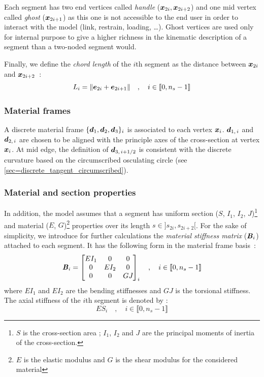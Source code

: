 Each segment has two end vertices called \emph{handle} ($\boldsymbol{x}_{2i}, \boldsymbol{x}_{2i+2}$) and one mid vertex called \emph{ghost} ($\boldsymbol{x}_{2i+1}$) as this one is not accessible to the end user in order to interact with the model (link, restrain, loading, \dots). Ghost vertices are used only for internal purpose to give a higher richness in the kinematic description of a segment than a two-noded segment would.

Finally, we define the \emph{chord length} of the $i$th segment as the distance between $\boldsymbol{x}_{2i}$ and $\boldsymbol{x}_{2i+2}$~:
\begin{equation}
	L_i = \lVert\boldsymbol{e}_{2i} + \boldsymbol{e}_{2i+1}\rVert \quad , \quad i \in \llbracket 0, n_s-1 \rrbracket
\end{equation}

\subsubsection{Material frames}
A discrete material frame $\{\boldsymbol{d}_{1}, \boldsymbol{d}_{2}, \boldsymbol{d}_{3}\}_i$ is associated to each vertex $\boldsymbol{x}_i$. $\boldsymbol{d}_{1,\,i}$ and $\boldsymbol{d}_{2,\,i}$ are chosen to be aligned with the principle axes of the cross-section at vertex $\boldsymbol{x}_i$. At mid edge, the definition of $\boldsymbol{d}_{3,\,i+1/2}$ is consistent with the discrete curvature based on the circumscribed osculating circle (see \cref{sec=discrete_tangent_circumscribed}).

\subsubsection{Material and section properties}
In addition, the model assumes that a segment has uniform section ($S$, $I_1$, $I_2$, $J$)\footnote{$S$ is the cross-section area ; $I_1$, $I_2$ and $J$ are the principal moments of inertia of the cross-section.} and material ($E$, $G$)\footnote{$E$ is the elastic modulus and $G$ is the shear  modulus for the considered material} properties over its length $s \in ]s_{2i},s_{2i+2}[$. For the sake of simplicity, we introduce for further calculations the \emph{material stiffness matrix} ($\boldsymbol{\mathit{B}}_i$) attached to each segment. It has the following form in the material frame basis~:
\begin{equation}
	\boldsymbol{\mathit{B}}_i = \begin{bmatrix} 
			EI_1		&	0		&	0		\\
			0		&	EI_{2}	&	0		\\
			0		&	0		&	GJ_{}	\\
		\end{bmatrix}_i
	\quad , \quad i \in \llbracket 0, n_s-1 \rrbracket
	\label{eq:stiffnessmatrix}
\end{equation}
where $EI_1$ and $EI_2$ are the bending stiffnesses and $GJ$ is the torsional stiffness. The axial stiffness of the $i$th segment is denoted by :
\begin{equation}
	ES_i 	\quad , \quad i \in \llbracket 0, n_s-1 \rrbracket
\end{equation}

